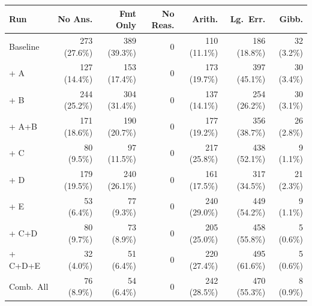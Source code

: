 \vspace{1em}
\noindent\begin{minipage}{\linewidth}
\centering
\footnotesize
{}
\label{tab:p4-errors-full}
\begin{tabular*}{\linewidth}{@{\extracolsep{\fill}}lrrrrrr}
\toprule
\textbf{Run} & \textbf{No Ans.} & \textbf{Fmt Only} & \textbf{No Reas.} & \textbf{Arith.} & \textbf{Lg.\ Err.} & \textbf{Gibb.} \\
\midrule
Baseline & 273 (27.6\%) & 389 (39.3\%) & 0 & 110 (11.1\%) & 186 (18.8\%) & 32 (3.2\%) \\
\midrule
+ A & 127 (14.4\%) & 153 (17.4\%) & 0 & 173 (19.7\%) & 397 (45.1\%) & 30 (3.4\%) \\
+ B & 244 (25.2\%) & 304 (31.4\%) & 0 & 137 (14.1\%) & 254 (26.2\%) & 30 (3.1\%) \\
+ A+B & 171 (18.6\%) & 190 (20.7\%) & 0 & 177 (19.2\%) & 356 (38.7\%) & 26 (2.8\%) \\
\midrule
+ C & 80 (9.5\%) & 97 (11.5\%) & 0 & 217 (25.8\%) & 438 (52.1\%) & 9 (1.1\%) \\
+ D & 179 (19.5\%) & 240 (26.1\%) & 0 & 161 (17.5\%) & 317 (34.5\%) & 21 (2.3\%) \\
+ E & 53 (6.4\%) & 77 (9.3\%) & 0 & 240 (29.0\%) & 449 (54.2\%) & 9 (1.1\%) \\
+ C+D & 80 (9.7\%) & 73 (8.9\%) & 0 & 205 (25.0\%) & 458 (55.8\%) & 5 (0.6\%) \\
+ C+D+E & 32 (4.0\%) & 51 (6.4\%) & 0 & 220 (27.4\%) & 495 (61.6\%) & 5 (0.6\%) \\
\midrule
Comb.\ All & 76 (8.9\%) & 54 (6.4\%) & 0 & 242 (28.5\%) & 470 (55.3\%) & 8 (0.9\%) \\
\bottomrule
\end{tabular*}
\end{minipage}
\vspace{1em}
